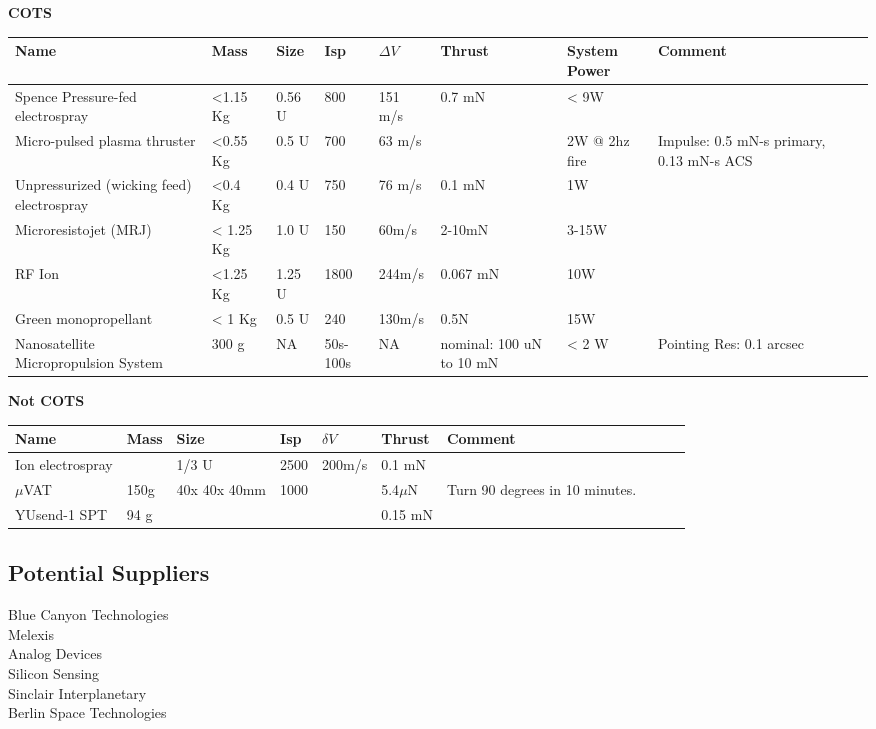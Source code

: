 {\bf COTS}
\begin{center}
     \begin{tabular}{ |p{2cm} | p{1cm} | p{1cm} |  p{1cm} | l | p{2cm} | l | p{4cm} | p{1cm} | p{3cm} |  }
     \hline

       {\bf Name} & {\bf Mass} & {\bf Size} & {\bf Isp} & {\bf $\Delta V$} & {\bf Thrust} & {\bf System Power}&{\bf Comment}  \\ \hline


     Spence Pressure-fed electrospray \cite{Spence} & <1.15 Kg& 0.56 U& 800 & 151 m/s & 0.7 mN &< 9W &   \\ \hline

     Micro-pulsed plasma thruster \cite{Spence} & <0.55 Kg& 0.5 U & 700 & 63 m/s&  & 2W @ 2hz fire &  Impulse: 0.5 mN-s primary, 0.13 mN-s ACS\\ \hline

     Unpressurized (wicking feed) electrospray \cite{Spence} & <0.4 Kg& 0.4 U& 750 & 76 m/s & 0.1 mN & 1W &  \\
     \hline

     Microresistojet (MRJ) \cite{Spence} & < 1.25 Kg& 1.0 U&150 & 60m/s & 2-10mN & 3-15W&   \\
     \hline

     RF Ion \cite{Spence} & <1.25 Kg& 1.25 U& 1800 & 244m/s & 0.067 mN &10W &   \\
     \hline

     Green monopropellant \cite{Spence} & < 1 Kg& 0.5 U& 240 & 130m/s & 0.5N & 15W&   \\
     \hline

	Nanosatellite Micropropulsion System \cite{Spence} & 300 g & NA &	50s-100s & NA & nominal: 100 uN to 10 mN & < 2 W & Pointing Res: 0.1 arcsec \\ \hline

     \end{tabular}
\end{center} 


{\bf Not COTS}
\begin{center}
     \begin{tabular}{ |p{2cm} | p{1cm} | p{1cm} |  p{1cm} | l | l | l | p{5cm} | p{1cm} | p{1cm} }
     \hline

       {\bf Name} & {\bf Mass} & {\bf Size} & {\bf Isp} & {\bf $\delta V$} & {\bf Thrust} & {\bf Comment}  \\ \hline

     Ion electrospray \cite{Ref:thr9} & & 1/3 U & 2500 & 200m/s & 0.1 mN&  \\ \hline
     {$\mu$}VAT&150g& 40x 40x 40mm & 1000&   & 5.4{$\mu$}N & Turn 90 degrees in 10 minutes.\\ \hline
     YUsend-1 SPT \cite{Ref:thr10} &94 g &   &   &   & 0.15 mN & \\ \hline
     \end{tabular}
\end{center}

\subsection{Potential Suppliers}
Blue Canyon Technologies\\
Melexis\\
Analog Devices\\
Silicon Sensing\\
Sinclair Interplanetary\\
Berlin Space Technologies\\


